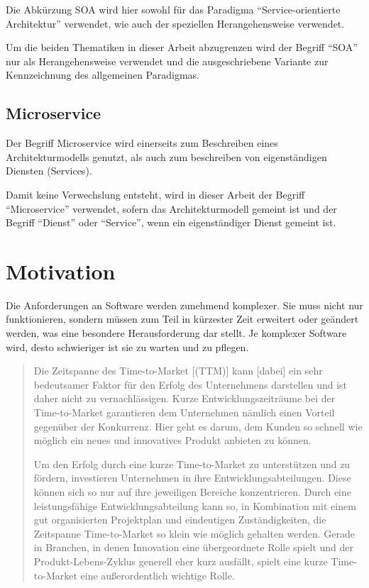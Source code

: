 Die Abkürzung SOA wird hier sowohl für das Paradigma "`Service-orientierte Architektur"' verwendet, wie auch der speziellen Herangehensweise verwendet.

Um die beiden Thematiken in dieser Arbeit abzugrenzen wird der Begriff "`SOA"' nur als Herangehensweise verwendet und die ausgeschriebene Variante zur Kennzeichnung des allgemeinen Paradigmas.

\subsection*{Microservice}
Der Begriff Microservice wird einerseits zum Beschreiben eines Architekturmodells genutzt, als auch zum beschreiben von eigenständigen Diensten (Services).

Damit keine Verwechslung entsteht, wird in dieser Arbeit der Begriff "`Microservice"' verwendet, sofern das Architekturmodell gemeint ist und der Begriff "`Dienst"' oder "`Service"', wenn ein eigenständiger Dienst gemeint ist.

\section{Motivation}
\label{sec:motivation}
Die Anforderungen an Software werden zunehmend komplexer. Sie muss nicht nur funktionieren, sondern müssen zum Teil in kürzester Zeit erweitert oder geändert werden, was eine besondere Herausforderung dar stellt. Je komplexer Software wird, desto schwieriger ist sie zu warten und zu pflegen. 

\begin{quotation}
\frqq Die Zeitspanne des Time-to-Market [(TTM)] kann [dabei] ein sehr bedeutsamer Faktor für den Erfolg des Unternehmens darstellen und ist daher nicht zu vernachlässigen. Kurze Entwicklungszeiträume bei der Time-to-Market garantieren dem Unternehmen nämlich einen Vorteil gegenüber der Konkurrenz. Hier geht es darum, dem Kunden so schnell wie möglich ein neues und innovatives Produkt anbieten zu können.
    
Um den Erfolg durch eine kurze Time-to-Market zu unterstützen und zu fördern, investieren Unternehmen in ihre Entwicklungsabteilungen. Diese können sich so nur auf ihre jeweiligen Bereiche konzentrieren. Durch eine leistungsfähige Entwicklungsabteilung kann so, in Kombination mit einem gut organisierten Projektplan und eindeutigen Zuständigkeiten, die Zeitspanne Time-to-Market so klein wie möglich gehalten werden. Gerade in Branchen, in denen Innovation eine übergeordnete Rolle spielt und der Produkt-Lebens-Zyklus generell eher kurz ausfällt, spielt eine kurze Time-to-Market eine außerordentlich wichtige Rolle.\flqq \cite{ttm}
\end{quotation}

